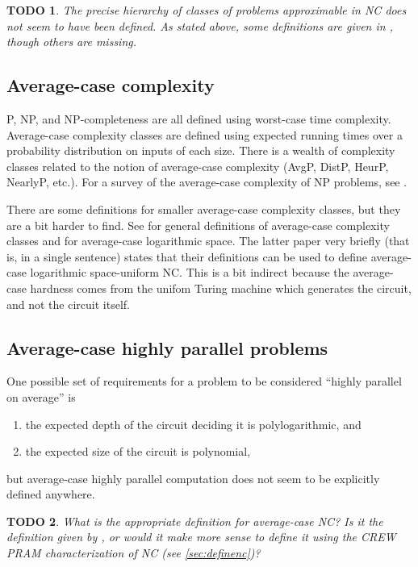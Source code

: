 \documentclass{article}
\newtheorem{todo}{TODO}
\begin{document}
\begin{todo}
  The precise hierarchy of classes of problems approximable in \textsf{NC} does not seem to have been defined.
  As stated above, some definitions are given in \cite{dsst97}, though others are missing.
\end{todo}

\subsection{Average-case complexity}

\textsf{P}, \textsf{NP}, and \textsf{NP}-completeness are all defined using worst-case time complexity.
Average-case complexity classes are defined using expected running times over a probability distribution on inputs of each size.
There is a wealth of complexity classes related to the notion of average-case complexity (\textsf{AvgP}, \textsf{DistP}, \textsf{HeurP}, \textsf{NearlyP}, etc.).
For a survey of the average-case complexity of \textsf{NP} problems, see \cite{bt06}.

There are some definitions for smaller average-case complexity classes, but they are a bit harder to find.
See \cite[Section~3.5.1]{yamakami97} for general definitions of average-case complexity classes and \cite[Section~7]{bcgl89} for average-case logarithmic space.
The latter paper very briefly (that is, in a single sentence) states that their definitions can be used to define average-case logarithmic space-uniform \textsf{NC}.
This is a bit indirect because the average-case hardness comes from the unifom Turing machine which generates the circuit, and not the circuit itself.

\subsection{Average-case highly parallel problems}

One possible set of requirements for a problem to be considered ``highly parallel on average'' is
\begin{enumerate}
  \item the expected depth of the circuit deciding it is polylogarithmic, and
  \item the expected size of the circuit is polynomial,
\end{enumerate}
but average-case highly parallel computation does not seem to be explicitly defined anywhere.

\begin{todo}
  What is the appropriate definition for average-case \textsf{NC}?
  Is it the definition given by \cite{bcgl89}, or would it make more sense to define it using the CREW PRAM characterization of \textsf{NC} (see \autoref{sec:definenc})?
\end{todo}
\end{document}
